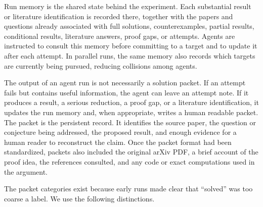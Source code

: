 \documentclass[11pt,reqno]{amsart}
\theoremstyle{plain}
\theoremstyle{definition}
\begin{document}
Run memory is the shared state behind the experiment. Each substantial result or literature identification is recorded there, together with the papers and questions already associated with full solutions, counterexamples, partial results, conditional results, literature answers, proof gaps, or attempts. Agents are instructed to consult this memory before committing to a target and to update it after each attempt. In parallel runs, the same memory also records which targets are currently being pursued, reducing collisions among agents.

The output of an agent run is not necessarily a solution packet. If an attempt fails but contains useful information, the agent can leave an attempt note. If it produces a result, a serious reduction, a proof gap, or a literature identification, it updates the run memory and, when appropriate, writes a human readable packet. The packet is the persistent record. It identifies the source paper, the question or conjecture being addressed, the proposed result, and enough evidence for a human reader to reconstruct the claim. Once the packet format had been standardized, packets also included the original arXiv PDF, a brief account of the proof idea, the references consulted, and any code or exact computations used in the argument.

The packet categories exist because early runs made clear that ``solved'' was too coarse a label. We use the following distinctions.
\end{document}

